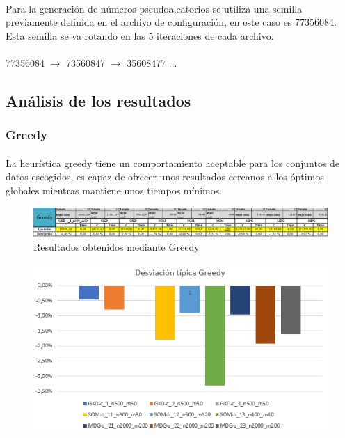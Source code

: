 \documentclass{article}
\begin{document}
	\paragraph{}Para la generación de números pseudoaleatorios se utiliza una semilla previamente definida en el archivo de configuración, en este caso es 77356084. Esta semilla se va rotando en las 5 iteraciones de cada archivo.
	
	
	\paragraph{} 77356084 $\rightarrow$ 73560847 $\rightarrow$ 35608477  ...
	
	
	\subsection{Análisis de los resultados}
	
	\subsubsection{Greedy}
	
	\paragraph{}La heurística greedy tiene un comportamiento aceptable para los conjuntos de datos escogidos, es capaz de ofrecer unos resultados cercanos a los óptimos globales mientras mantiene unos tiempos mínimos.
	
	\begin{figure}[H]
		
		\centering
		\includegraphics[scale=0.4]{img/greegyResult}
		\caption{Resultados obtenidos mediante Greedy}
		
	\end{figure}
	
	\begin{figure}[H]
		
		\centering
		\includegraphics[scale=0.4]{img/DTGreedy}
		
	\end{figure}
	
\end{document}
